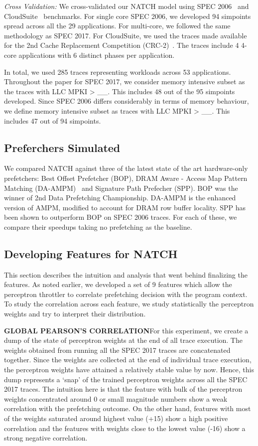 \textit{Cross Validation:} We cross-validated our NATCH model using SPEC
2006~\cite{SPEC2006} and CloudSuite~\cite{CloudSuite} benchmarks.  
For single core
SPEC 2006, we developed 94 simpoints spread across all the 29
applications. For multi-core, 
we followed the same methodology as SPEC 2017. 
For CloudSuite, we used the traces made available for
the 2nd Cache Replacement Competition (CRC-2)~\cite{CRC_2}.  The traces
include 4 4-core applications with 6 distinct phases per
application.  


In total, we used 285 traces representing workloads
across 53 applications. Throughout the paper for SPEC 2017, 
we consider memory intensive subset as the traces with LLC MPKI > \_\_. 
This includes 48 out of the 95 simpoints developed.
Since SPEC 2006 differs considerably in terms of memory behaviour, we 
define memory intensive subset as traces with LLC MPKI > \_\_.
This includes 47 out of 94 simpoints.

\subsection{Preferchers Simulated}
\label{Method-Prefetchers}
We compared NATCH against three of the latest state of the art
hardware-only prefetchers: Best Offset Prefetcher (BOP), DRAM Aware - Access Map
Pattern Matching (DA-AMPM)~\cite{DA_AMPM} and Signature Path Prefecher
(SPP).  BOP was the winner of 2nd Data Prefetching Championship.
DA-AMPM is the enhanced version of AMPM, modified to account for DRAM
row buffer locality.  SPP has been shown to outperform BOP on SPEC
2006 traces.  For each of these, we compare their speedups taking no
prefetching as the baseline.


\subsection{Developing Features for NATCH}
\label{Method-Features}
This section describes the intuition and analysis that went behind
finalizing the features.  As noted earlier, we developed a set of 9
features which allow the perceptron throttler to correlate prefetching
decision with the program context.  To study the correlation across
each feature, we study statistically the perceptron weights and try to
interpret their distribution.

\textbf{GLOBAL PEARSON'S CORRELATION}\newline For this experiment, we
create a dump of the state of perceptron weights at the end of all
trace execution.  The weights obtained from running all the SPEC 2017
traces are concatenated together.  Since the weights are collected at
the end of individual trace execution, the perceptron weights have
attained a relatively stable value by now.  Hence, this dump
represents a `snap' of the trained perceptron weights across all the
SPEC 2017 traces.  The intuition here is that the feature with bulk of
the perceptron weights concentrated around 0 or small magnitude
numbers show a weak correlation with the prefetching outcome.  On the
other hand, features with most of the weights saturated around highest
value (+15) show a high positive correlation and the features with
weights close to the lowest value (-16) show a strong negative
correlation.

